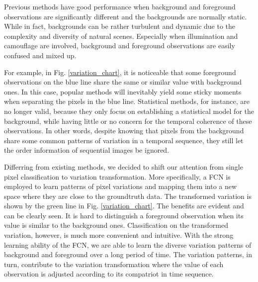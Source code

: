 \documentclass[journal]{IEEEtran}
\newcommand{\reffig}[1]{Fig. \ref{#1}}
\begin{document}

Previous methods have good performance when background and foreground observations are significantly different and the backgrounds are normally static. 
While in fact, backgrounds can be rather turbulent and dynamic due to the complexity and diversity of natural scenes. 
Especially when illumination and camouflage are involved, background and foreground observations are easily confused and mixed up. 

For example, in \reffig{variation_chart}, it is noticeable that some foreground observations on the blue line share the same or similar value with background ones. 
In this case, popular methods will inevitably yield some sticky moments when separating the pixels in the blue line. 
Statistical methods, for instance, are no longer valid, because they only focus on establishing a statistical model for the background, while having little or no concern for the temporal coherence of these observations. 
In other words, despite knowing that pixels from the background share some common patterns of variation in a temporal sequence, they still let the order information of sequential images be ignored. 

Differring from existing methods, we decided to shift our attention from single pixel classification to variation transformation.
More specifically, a FCN is employed to learn patterns of pixel variations and mapping them into a new space where they are close to the groundtruth data.
The transformed variation is shown by the green line in \reffig{variation_chart}. 
The benefits are evident and can be clearly seen. 
It is hard to distinguish a foreground observation when its value is similar to the background ones. 
Classification on the transformed variation, however, is much more convenient and intuitive. 
With the strong learning ability of the FCN, we are able to learn the diverse variation patterns of background and foreground over a long period of time.
The variation patterns, in turn, contribute to the variation transformation where the value of each observation is adjusted according to its compatriot in time sequence.
\end{document}
